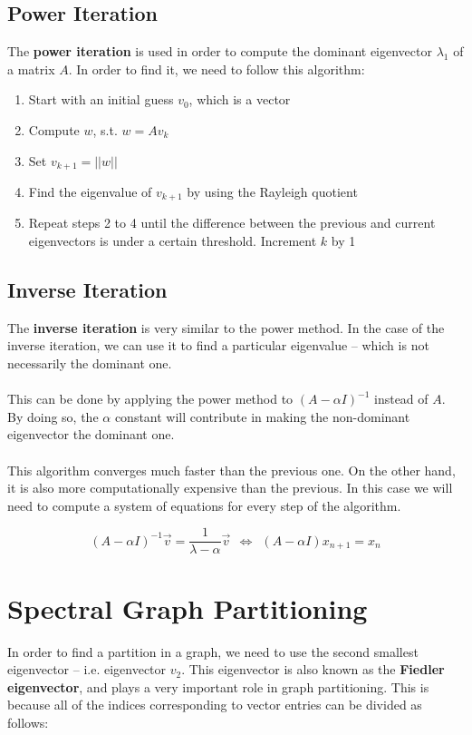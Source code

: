 \documentclass{article}
\begin{document}
\subsection{Power Iteration}
The \textbf{power iteration} is used in order to compute the dominant eigenvector $\lambda_1$ of a matrix $A$. In order to find it, we need to follow this algorithm:

\begin{enumerate}
	\item Start with an initial guess $v_0$, which is a vector
	\item Compute $w$, s.t. $w = Av_k$
	\item Set $v_{k+1} = ||w||$
	\item Find the eigenvalue of $v_{k+1}$ by using the Rayleigh quotient
	\item Repeat steps 2 to 4 until the difference between the previous and current eigenvectors is under a certain threshold. Increment $k$ by 1
\end{enumerate}

\subsection{Inverse Iteration}
The \textbf{inverse iteration} is very similar to the power method. In the case of the inverse iteration, we can use it to find a particular eigenvalue -- which is not necessarily the dominant one. \\ \\
This can be done by applying the power method to $(A-\alpha I)^{-1}$ instead of $A$. By doing so, the $\alpha$ constant will contribute in making the non-dominant eigenvector the dominant one. \\ \\
This algorithm converges much faster than the previous one. On the other hand, it is also more computationally expensive than the previous. In this case we will need to compute a system of equations for every step of the algorithm.

\[ (A-\alpha I)^{-1} \overrightarrow{v} = \frac{1}{\lambda - \alpha}\overrightarrow{v}~~ \iff ~~(A-\alpha I) x_{n+1} = x_n \]

\section{Spectral Graph Partitioning}
In order to find a partition in a graph, we need to use the second smallest eigenvector -- i.e. eigenvector $v_2$. This eigenvector is also known as the \textbf{Fiedler eigenvector}, and plays a very important role in graph partitioning. This is because all of the indices corresponding to vector entries can be divided as follows:
\end{document}
